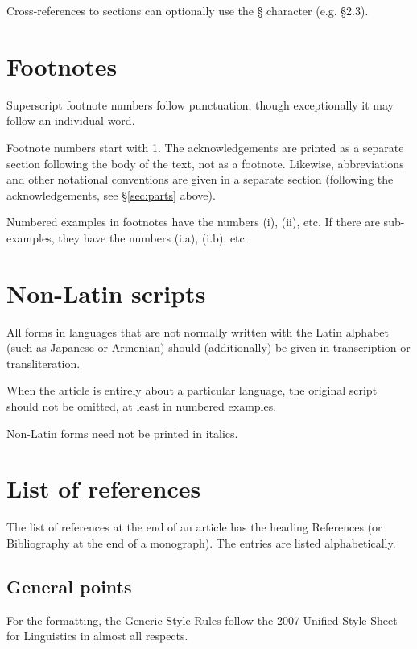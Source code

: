 \documentclass[a4paper]{article}
\newcommand{\sectref}[1]{§\ref{#1}}
\newcommand{\gsrex}[1]{{\color{blue}#1}}
\begin{document}
Cross-references to sections can optionally use the \gsrex{§}
character (e.g. \gsrex{§2.3}).

\section{Footnotes}\label{sec:footnotes}

Superscript footnote numbers follow punctuation, though exceptionally it
may follow an individual word.

Footnote numbers start with \gsrex{1}. The
acknowledgements are printed as a separate section following the body of
the text, not as a footnote. Likewise, abbreviations and other
notational conventions are given in a separate section (following the
acknowledgements, see \sectref{sec:parts} above).

Numbered examples in footnotes have the
numbers \gsrex{(i)}, 
\gsrex{(ii)}, etc. If there are sub- examples, they have the
numbers \gsrex{(i.a)}, 
\gsrex{(i.b)}, etc.

\section{Non-Latin scripts}\label{sec:non-latin-scripts}

All forms in languages that are not normally written with the Latin
alphabet (such as Japanese or Armenian) should (additionally) be given
in transcription or transliteration.

When the article is entirely about
a particular language, the original script should not be omitted, at
least in numbered examples. 

Non-Latin forms need not be printed in
italics.

\section{List of references}\label{sec:listofreferences}

The list of references at the end of an article has the heading
\gsrex{References} (or \gsrex{Bibliography} at the end of a monograph). The entries are
listed alphabetically.

\subsection{General points}\label{sec:general-points}

For the formatting, the Generic Style Rules follow the 2007 Unified
Style Sheet for Linguistics in almost all respects. 
\end{document}
